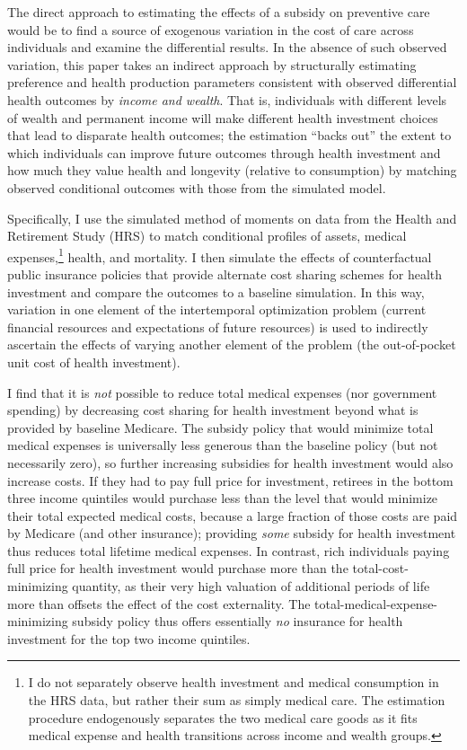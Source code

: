 \documentclass[12pt,pdftex,letterpaper]{article}
\begin{document}
The direct approach to estimating the effects of a subsidy on preventive care would be to find a source of exogenous variation in the cost of care across individuals and examine the differential results.  In the absence of such observed variation, this paper takes an indirect approach by structurally estimating preference and health production parameters consistent with observed differential health outcomes by \textit{income and wealth}.  That is, individuals with different levels of wealth and permanent income will make different health investment choices that lead to disparate health outcomes; the estimation ``backs out'' the extent to which individuals can improve future outcomes through health investment and how much they value health and longevity (relative to consumption) by matching observed conditional outcomes with those from the simulated model.

Specifically, I use the simulated method of moments on data from the Health and Retirement Study (HRS) to match conditional profiles of assets, medical expenses,\footnote{I do not separately observe health investment and medical consumption in the HRS data, but rather their sum as simply medical care.  The estimation procedure endogenously separates the two medical care goods as it fits medical expense and health transitions across income and wealth groups.} health, and mortality.  I then simulate the effects of counterfactual public insurance policies that provide alternate cost sharing schemes for health investment and compare the outcomes to a baseline simulation.  In this way, variation in one element of the intertemporal optimization problem (current financial resources and expectations of future resources) is used to indirectly ascertain the effects of varying another element of the problem (the out-of-pocket unit cost of health investment). 

I find that it is \textit{not} possible to reduce total medical expenses (nor government spending) by decreasing cost sharing for health investment beyond what is provided by baseline Medicare.  The subsidy policy that would minimize total medical expenses is universally less generous than the baseline policy (but not necessarily zero), so further increasing subsidies for health investment would also increase costs.  If they had to pay full price for investment, retirees in the bottom three income quintiles would purchase less than the level that would minimize their total expected medical costs, because a large fraction of those costs are paid by Medicare (and other insurance); providing \textit{some} subsidy for health investment thus reduces total lifetime medical expenses.  In contrast, rich individuals paying full price for health investment would purchase more than the total-cost-minimizing quantity, as their very high valuation of additional periods of life more than offsets the effect of the cost externality.  The total-medical-expense-minimizing subsidy policy thus offers essentially \textit{no} insurance for health investment for the top two income quintiles.
\end{document}
